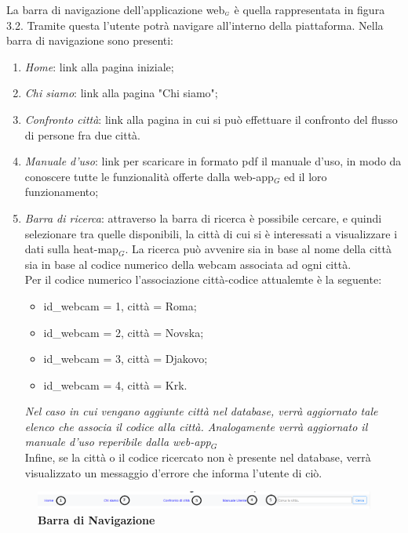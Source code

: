 La barra di navigazione dell'applicazione web$_{\scaleto{G}{3pt}}$ è quella rappresentata in figura 3.2. Tramite questa l'utente potrà navigare all'interno della piattaforma. Nella barra di navigazione sono presenti:
\begin{enumerate}
	\item \textit{Home}: link alla pagina iniziale;
	\item \textit{Chi siamo}: link alla pagina "Chi siamo";
	\item \textit{Confronto città}: link alla pagina in cui si può effettuare il confronto del flusso di persone fra due città.
	\item \textit{Manuale d'uso}: link per scaricare in formato pdf il manuale d'uso, in modo da conoscere tutte le funzionalità offerte dalla web-app$_G$ ed il loro funzionamento;
	\item \textit{Barra di ricerca}: attraverso la barra di ricerca è possibile cercare, e quindi selezionare tra quelle disponibili, la città di cui si è interessati a visualizzare i dati sulla heat-map$_G$. La ricerca può avvenire sia in base al nome della città sia in base al codice numerico della webcam associata ad ogni città. \\
	Per il codice numerico l'associazione città-codice attualemte è la seguente:
	\begin{itemize}
		\item id{\_}webcam = 1, città = Roma;
		\item id{\_}webcam = 2, città = Novska;
		\item id{\_}webcam = 3, città = Djakovo;
		\item id{\_}webcam = 4, città = Krk.
	\end{itemize}
	\textit{Nel caso in cui vengano aggiunte città nel database, verrà aggiornato tale elenco che associa il codice alla città. Analogamente verrà aggiornato il manuale d'uso reperibile dalla web-app$_G$} \\
	Infine, se la città o il codice ricercato non è presente nel database, verrà visualizzato un messaggio d'errore che informa l'utente di ciò.
\end{enumerate}

\begin{center}
	\begin{figure}[H]
		\includegraphics[width=1\linewidth]{../immagini/manualeUtente/navbar.png}
		\caption{\textbf{Barra di Navigazione}}
	\end{figure}
\end{center}

